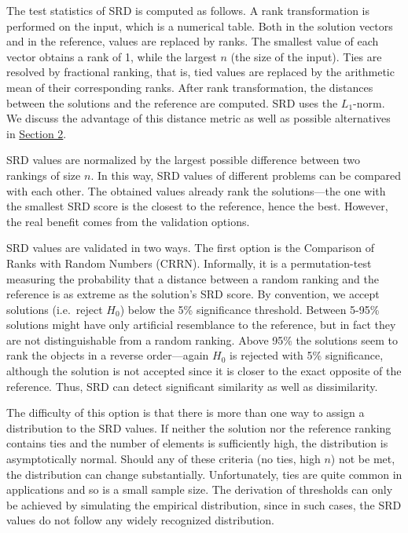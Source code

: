The test statistics of SRD is computed as follows. A rank transformation is performed on the input, which is a numerical table. Both in the solution vectors and in the reference, values are replaced by ranks. The smallest value of each vector obtains a rank of 1, while the largest $n$ (the size of the input). Ties are resolved by fractional ranking, that is, tied values are replaced by the arithmetic mean of their corresponding ranks. After rank transformation, the distances between the solutions and the reference are computed. SRD uses the $L_1$-norm. We discuss the advantage of this distance metric as well as possible alternatives in  \hyperref[sec:lit_distance]{Section 2}. %

SRD values are normalized by the largest possible difference between two rankings of size $n$. In this way, SRD values of different problems can be compared with each other. The obtained values already rank the solutions---the one with the smallest SRD score is the closest to the reference, hence the best. However, the real benefit comes from the validation options.

SRD values are validated in two ways. The first option is the Comparison of Ranks with Random Numbers (CRRN). Informally, it is a permutation-test measuring the probability that a distance between a random ranking and the reference is as extreme as the solution's SRD score. By convention, we accept solutions (i.e.\ reject $H_0$) below the 5\% significance threshold. Between 5-95\% solutions might have only artificial resemblance to the reference, but in fact they are not distinguishable from a random ranking. Above 95\% the solutions seem to rank the objects in a reverse order---again $H_0$ is rejected with 5\% significance, although the solution is not accepted since it is closer to the exact opposite of the reference. Thus, SRD can detect significant similarity as well as dissimilarity.

The difficulty of this option is that there is more than one way to assign a distribution to the SRD values. If neither the solution nor the reference ranking contains ties and the number of elements is sufficiently high, the distribution is asymptotically normal. Should any of these criteria (no ties, high $n$) not be met, the distribution can change substantially. Unfortunately, ties are quite common in applications and so is a small sample size. The derivation of thresholds can only be achieved by simulating the empirical distribution, since in such cases, the SRD values do not follow any widely recognized distribution.

